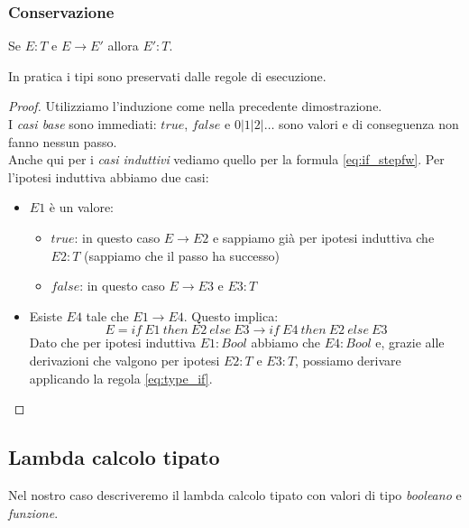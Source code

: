 \subsubsection{Conservazione}
\begin{definition}[Conservazione]
	Se $E:T$ e $E \rightarrow E'$ allora $E':T$.
\end{definition}
In pratica i tipi sono preservati dalle regole di esecuzione.
\begin{proof}
	\label{proof_conservazione}
	Utilizziamo l'induzione come nella precedente dimostrazione.\\
	I \textit{casi base} sono immediati: $true$, $false$ e $0 \vert 1 \vert 2 \vert \ldots$ sono valori e di conseguenza non fanno nessun passo. \\
	Anche qui per i \textit{casi induttivi} vediamo quello per la formula \ref{eq:if_stepfw}. Per l'ipotesi induttiva abbiamo due casi:
	\begin{itemize}
		\item $E1$ è un valore: \begin{itemize}
			\item $true$: in questo caso $E \rightarrow E2$ e sappiamo già per ipotesi induttiva che $E2:T$ (sappiamo che il passo ha successo)
			\item $false$: in questo caso $E \rightarrow E3$ e $E3:T$
		\end{itemize}
		\item Esiste $E4$ tale che $E1 \rightarrow E4$. Questo implica:
		\begin{equation*}
			E = if \: E1 \: then \: E2 \: else \: E3 \rightarrow if \: E4 \: then \: E2 \: else \: E3
		\end{equation*}
		Dato che per ipotesi induttiva $E1:Bool$ abbiamo che $E4:Bool$ e, grazie alle derivazioni che valgono per ipotesi $E2:T$ e $E3:T$, possiamo derivare applicando la regola \ref{eq:type_if}.
	\end{itemize}
\end{proof}

\newpage
\subsection{Lambda calcolo tipato}
Nel nostro caso descriveremo il lambda calcolo tipato con valori di tipo \textit{booleano} e \textit{funzione}.
